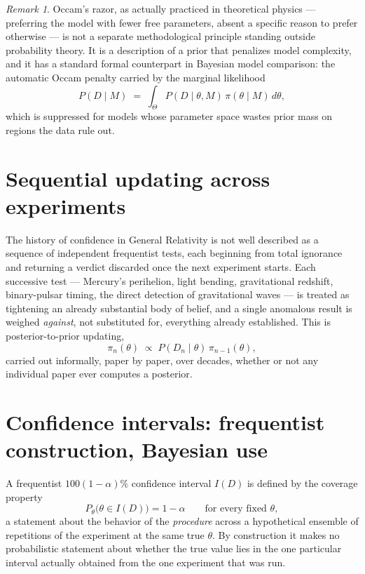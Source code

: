 \documentclass[11pt]{book}
\theoremstyle{definition}
\theoremstyle{plain}
\theoremstyle{remark}
\newtheorem{remark}[definition]{Remark}
\begin{document}
\begin{remark}
Occam's razor, as actually practiced in theoretical physics --- preferring the model with fewer free parameters, absent a specific reason to prefer otherwise --- is not a separate methodological principle standing outside probability theory. It is a description of a prior that penalizes model complexity, and it has a standard formal counterpart in Bayesian model comparison: the automatic Occam penalty carried by the marginal likelihood
\begin{equation}
P(D \mid M) \;=\; \int_{\Theta} P(D \mid \theta, M)\,\pi(\theta \mid M)\, d\theta,
\end{equation}
which is suppressed for models whose parameter space wastes prior mass on regions the data rule out.
\end{remark}

\section{Sequential updating across experiments}

The history of confidence in General Relativity is not well described as a sequence of independent frequentist tests, each beginning from total ignorance and returning a verdict discarded once the next experiment starts. Each successive test --- Mercury's perihelion, light bending, gravitational redshift, binary-pulsar timing, the direct detection of gravitational waves --- is treated as tightening an already substantial body of belief, and a single anomalous result is weighed \emph{against}, not substituted for, everything already established. This is posterior-to-prior updating,
\begin{equation}
\pi_n(\theta) \;\propto\; P(D_n \mid \theta)\,\pi_{n-1}(\theta),
\end{equation}
carried out informally, paper by paper, over decades, whether or not any individual paper ever computes a posterior.

\section{Confidence intervals: frequentist construction, Bayesian use}

A frequentist $100(1-\alpha)\%$ confidence interval $I(D)$ is defined by the coverage property
\begin{equation}
P_\theta\big(\theta \in I(D)\big) = 1-\alpha \qquad \text{for every fixed } \theta,
\end{equation}
a statement about the behavior of the \emph{procedure} across a hypothetical ensemble of repetitions of the experiment at the same true $\theta$. By construction it makes no probabilistic statement about whether the true value lies in the one particular interval actually obtained from the one experiment that was run.
\end{document}
